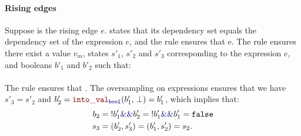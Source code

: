\begin{skippableproof}
    \paragraph{Rising edges}
    Suppose  is the rising edge $e$.
     states that
    its dependency set equals the dependency set of the expression $e$, and the rule
     ensures that \exprTypedReact
    {\Theta}{e}{\dType}.
    The rule  ensures there exist
    a value $v_m$, states $s'_1$, $s'_2$ and $s'_3$ corresponding to the
    expression $e$, and booleans $b'_1$ and $b'_2$ such that:
    \\\noindent{}\\\noindent
    The rule  ensures that .
    The oversampling  on expressions
    ensures that we have  $s'_3 = s'_2$ and $b'_2 = \intoVal{\kwf{bool}}{b'_1}{\bot} =
        b'_1$, which implies that:
    \begin{align*}
        b_2 & = \kwf{!}b'_1 \kwf{\&\&} b'_2 = \kwf{!}b'_1 \kwf{\&\&} b'_1 = \false \\
        s_3 & = (b'_2, s'_3) = (b'_1, s'_2) = s_2.
    \end{align*}

    \setcounter{paragraph}{0}
\end{skippableproof}

